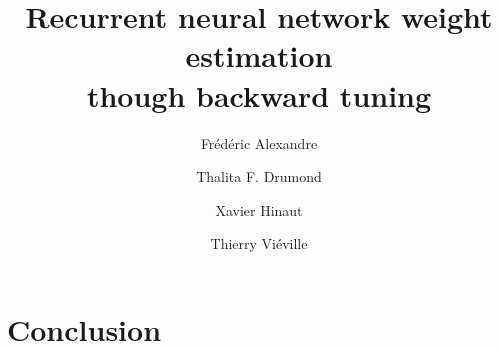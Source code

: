 \documentclass[a4,12pt,twoside]{article}
\newif\ifRR
\begin{document}
\ifRR
\makeRR 
\else
\title{Recurrent neural network weight estimation \\ though backward tuning}
\author[1]{Fr\'ed\'eric Alexandre}
\author[1]{Thalita F. Drumond}
\author[1]{Xavier Hinaut}
\author[1]{Thierry Vi\'eville}
\maketitle
\begin{abstract}\end{abstract}
\fi
\iffalse
\fi




\section{Conclusion}
\appendix
\clearpage
\clearpage
\clearpage
\clearpage
\clearpage
\clearpage{\scriptsize  }
\tableofcontents
\iffalse
\fi
\end{document}
